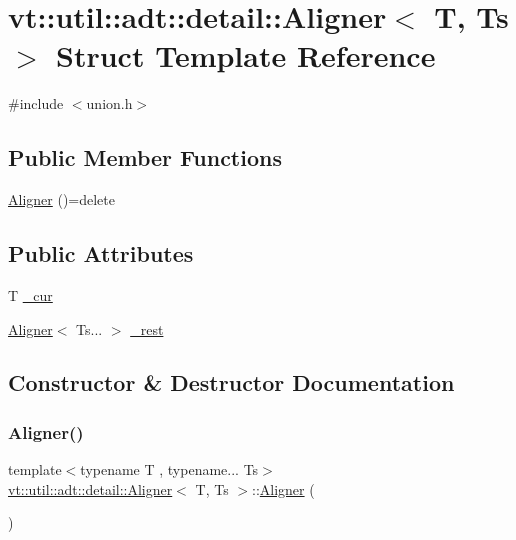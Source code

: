 \hypertarget{structvt_1_1util_1_1adt_1_1detail_1_1_aligner}{}\section{vt\+:\+:util\+:\+:adt\+:\+:detail\+:\+:Aligner$<$ T, Ts $>$ Struct Template Reference}
\label{structvt_1_1util_1_1adt_1_1detail_1_1_aligner}


{\ttfamily \#include $<$union.\+h$>$}

\subsection*{Public Member Functions}
\begin{DoxyCompactItemize}
\item 
\hyperlink{structvt_1_1util_1_1adt_1_1detail_1_1_aligner_a998732c9b376b2a0020425ba72d5d5ae}{Aligner} ()=delete
\end{DoxyCompactItemize}
\subsection*{Public Attributes}
\begin{DoxyCompactItemize}
\item 
T \hyperlink{structvt_1_1util_1_1adt_1_1detail_1_1_aligner_aafdf38bb15e0136c6c529108f28c2dee}{\+\_\+cur}
\item 
\hyperlink{structvt_1_1util_1_1adt_1_1detail_1_1_aligner}{Aligner}$<$ Ts... $>$ \hyperlink{structvt_1_1util_1_1adt_1_1detail_1_1_aligner_a4115223efc04e8781590dea362fc36f0}{\+\_\+rest}
\end{DoxyCompactItemize}


\subsection{Constructor \& Destructor Documentation}
\mbox{\label{structvt_1_1util_1_1adt_1_1detail_1_1_aligner_a998732c9b376b2a0020425ba72d5d5ae}} 
\subsubsection{\texorpdfstring{Aligner()}{Aligner()}}
{\footnotesize\ttfamily template$<$typename T , typename... Ts$>$ \\
\hyperlink{structvt_1_1util_1_1adt_1_1detail_1_1_aligner}{vt\+::util\+::adt\+::detail\+::\+Aligner}$<$ T, Ts $>$\+::\hyperlink{structvt_1_1util_1_1adt_1_1detail_1_1_aligner}{Aligner} (\begin{DoxyParamCaption}{ }\end{DoxyParamCaption})\hspace{0.3cm}{\ttfamily [delete]}}



